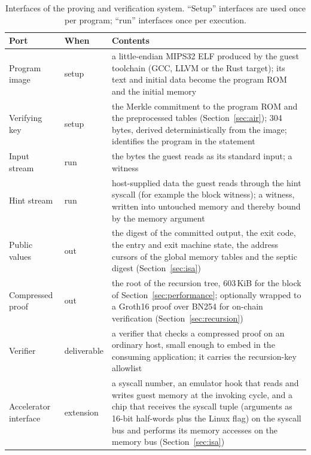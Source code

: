\begin{table}[t]
\centering
\small
\caption{Interfaces of the proving and verification system. ``Setup'' interfaces are used once per program; ``run'' interfaces once per execution.}
\label{tab:ports}
\begin{tabular}{>{\raggedright\arraybackslash}p{} >{\raggedright\arraybackslash}p{} >{\raggedright\arraybackslash}p{}}
\toprule
Port & When & Contents \\
\midrule
Program image & setup & a little-endian MIPS32 ELF produced by the guest toolchain (GCC, LLVM or the Rust target); its text and initial data become the program ROM and the initial memory \\
Verifying key & setup & the Merkle commitment to the program ROM and the preprocessed tables (Section~\ref{sec:air}); 304 bytes, derived deterministically from the image; identifies the program in the statement \\
Input stream & run & the bytes the guest reads as its standard input; a witness \\
Hint stream & run & host-supplied data the guest reads through the hint syscall (for example the block witness); a witness, written into untouched memory and thereby bound by the memory argument \\
Public values & out & the digest of the committed output, the exit code, the entry and exit machine state, the address cursors of the global memory tables and the septic digest (Section~\ref{sec:isa}) \\
Compressed proof & out & the root of the recursion tree, 603\,KiB for the block of Section~\ref{sec:performance}; optionally wrapped to a Groth16 proof over BN254 for on-chain verification (Section~\ref{sec:recursion}) \\
Verifier & deliverable & a verifier that checks a compressed proof on an ordinary host, small enough to embed in the consuming application; it carries the recursion-key allowlist \\
Accelerator interface & extension & a syscall number, an emulator hook that reads and writes guest memory at the invoking cycle, and a chip that receives the syscall tuple (arguments as 16-bit half-words plus the Linux flag) on the syscall bus and performs its memory accesses on the memory bus (Section~\ref{sec:isa}) \\
\bottomrule
\end{tabular}
\end{table}

